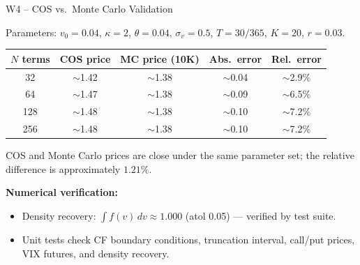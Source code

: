 \documentclass[aspectratio=169, 11pt]{beamer}
\begin{document}
\begin{frame}{W4 -- COS vs.\ Monte Carlo Validation}

\small
Parameters: $v_0\!=\!0.04$, $\kappa\!=\!2$, $\theta\!=\!0.04$, $\sigma_v\!=\!0.5$, $T\!=\!30/365$, $K\!=\!20$, $r\!=\!0.03$.

\medskip
\begin{center}
\begin{tabular}{ccccc}
  \toprule
  $N$ terms & COS price & MC price (10K) & Abs.\ error & Rel.\ error \\
  \midrule
  32  & $\sim$1.42 & $\sim$1.38 & $\sim$0.04 & $\sim$2.9\% \\
  64  & $\sim$1.47 & $\sim$1.38 & $\sim$0.09 & $\sim$6.5\% \\
  128 & $\sim$1.48 & $\sim$1.38 & $\sim$0.10 & $\sim$7.2\% \\
  256 & $\sim$1.48 & $\sim$1.38 & $\sim$0.10 & $\sim$7.2\% \\
  \bottomrule
\end{tabular}
\end{center}

COS and Monte Carlo prices are close under the same parameter set; the relative difference is approximately $1.21\%$.

\medskip
\textbf{Numerical verification:}
\begin{itemize}
  \item Density recovery: $\int f(v)\,dv \approx 1.000$ (atol 0.05) --- verified by test suite.
  \item Unit tests check CF boundary conditions, truncation interval, call/put prices, VIX futures, and density recovery.
\end{itemize}
\end{frame}
\end{document}
